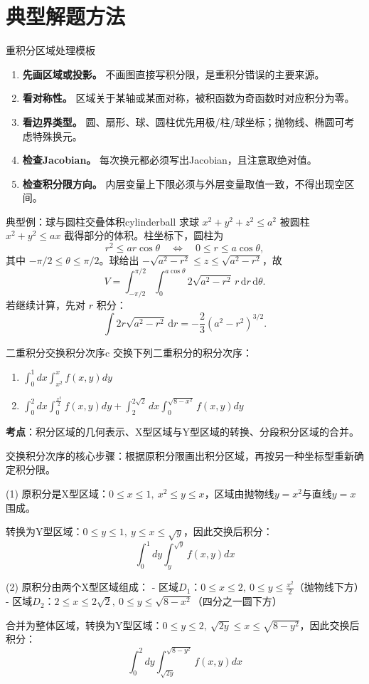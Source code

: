 \documentclass[UTF8,zihao=-4,openany]{ctexbook}
\newcommand{\dd}{\,\mathrm{d}}
\begin{document}
\section{典型解题方法}
\begin{methodbox}{重积分区域处理模板}
\begin{enumerate}
\item \textbf{先画区域或投影。} 不画图直接写积分限，是重积分错误的主要来源。
\item \textbf{看对称性。} 区域关于某轴或某面对称，被积函数为奇函数时对应积分为零。
\item \textbf{看边界类型。} 圆、扇形、球、圆柱优先用极/柱/球坐标；抛物线、椭圆可考虑特殊换元。
\item \textbf{检查Jacobian。} 每次换元都必须写出Jacobian，且注意取绝对值。
\item \textbf{检查积分限方向。} 内层变量上下限必须与外层变量取值一致，不得出现空区间。
\end{enumerate}
\end{methodbox}

\begin{example}{典型例：球与圆柱交叠体积}{cylinderball}
求球 $x^2+y^2+z^2\le a^2$ 被圆柱 $x^2+y^2\le ax$ 截得部分的体积。柱坐标下，圆柱为
\[
r^2\le ar\cos\theta\quad\Longleftrightarrow\quad 0\le r\le a\cos\theta,
\]
其中 $-\pi/2\le\theta\le\pi/2$。球给出 $-\sqrt{a^2-r^2}\le z\le\sqrt{a^2-r^2}$，故
\[
V=\int_{-\pi/2}^{\pi/2}\int_0^{a\cos\theta}2\sqrt{a^2-r^2}\,r\dd r\dd\theta.
\]
若继续计算，先对 $r$ 积分：
\[
\int 2r\sqrt{a^2-r^2}\dd r=-\frac{2}{3}(a^2-r^2)^{3/2}.
\]
\end{example}

\begin{example}{二重积分交换积分次序}{c}
交换下列二重积分的积分次序：
\begin{enumerate}
  \item $\displaystyle \int_{0}^{1} dx \int_{x^2}^{x} f(x,y) dy$
  \item $\displaystyle \int_{0}^{2} dx \int_{0}^{\frac{x^2}{2}} f(x,y) dy + \int_{2}^{2\sqrt{2}} dx \int_{0}^{\sqrt{8-x^2}} f(x,y) dy$
\end{enumerate}
\tcblower
\smallskip
\noindent \textbf{考点}：积分区域的几何表示、X型区域与Y型区域的转换、分段积分区域的合并。

交换积分次序的核心步骤：根据原积分限画出积分区域，再按另一种坐标型重新确定积分限。

\medskip
(1) 原积分是X型区域：$0\leq x\leq 1,\ x^2\leq y\leq x$，区域由抛物线$y=x^2$与直线$y=x$围成。

转换为Y型区域：$0\leq y\leq 1,\ y\leq x\leq \sqrt{y}$，因此交换后积分：
$$
\int_{0}^{1} dy \int_{y}^{\sqrt{y}} f(x,y) dx
$$

\medskip
(2) 原积分由两个X型区域组成：
- 区域$D_1$：$0\leq x\leq 2,\ 0\leq y\leq \frac{x^2}{2}$（抛物线下方）
- 区域$D_2$：$2\leq x\leq 2\sqrt{2},\ 0\leq y\leq \sqrt{8-x^2}$（四分之一圆下方）

合并为整体区域，转换为Y型区域：$0\leq y\leq 2,\ \sqrt{2y}\leq x\leq \sqrt{8-y^2}$，因此交换后积分：
$$
\int_{0}^{2} dy \int_{\sqrt{2y}}^{\sqrt{8-y^2}} f(x,y) dx
$$
\end{example}
\end{document}
